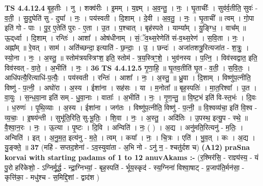 \documentclass[17pt]{extarticle}
\begin{document}
                  \newline
                                \textbf{ TS 4.4.12.4} \newline
                  बृ॒ह॒तीः । नु । शक्व॑रीः । इ॒मम् । य॒ज्ञ्म् । अ॒व॒न्तु॒ । नः॒ । घृ॒ताचीः᳚ । सुव॑र्व॒तीति॒ सुवः॑ - व॒ती॒ । सु॒दुघेति॑ सु - दुघा᳚ । नः॒ । पय॑स्वती । दि॒शाम् । दे॒वी । अ॒व॒तु॒ । नः॒ । घृ॒ताची᳚ ॥ त्वम् । गो॒पा इति॑ गो - पाः । पु॒र॒ ए॒तेति॑ पुरः - ए॒ता । उ॒त । प॒श्चात् । बृह॑स्पते । याम्या᳚म् । यु॒ङ्ग्धि॒ । वाच᳚म् ॥ ऊ॒द्‌र्ध्वा । दि॒शाम् । रन्तिः॑ । आशा᳚ । ओष॑धीनाम् । सं॒ॅव॒थ्स॒रेणेति॑ सं-व॒थ्स॒रेण॑ । स॒वि॒ता । नः॒ । अह्ना᳚म् ॥ रे॒वत् । साम॑ । अति॑॑च्छन्दा॒ इत्याति॑ - छ॒न्दाः॒ । उ॒ । छन्दः॑ । अजा॑तशत्रु॒रित्यजा॑त - श॒त्रुः॒ । स्यो॒ना । नः॒ । अ॒स्तु॒ ॥ स्तोम॑त्रयस्त्रिꣳश॒ इति॒ स्तोम॑ - त्र॒य॒स्त्रिꣳ॒॒शे॒ । भुव॑नस्य । प॒त्नि॒ । विव॑स्वद्वात॒ इति॒ विव॑स्वत् - वा॒ते॒ । अ॒भीति॑ । नः॒ । \textbf{  36} \newline
                  \newline
                                \textbf{ TS 4.4.12.5} \newline
                  गृ॒णा॒हि॒ ॥ घृ॒तव॒तीति॑ घृ॒त - व॒ती॒ । स॒वि॒तः॒ । आधि॑पत्यै॒रित्याधि॑-प॒त्यैः॒ । पय॑स्वती । रन्तिः॑ । आशा᳚ । नः॒ । अ॒स्तु॒ ॥ ध्रु॒वा । दि॒शाम् । विष्णु॑प॒त्नीति॒ विष्णु॑ - प॒त्नी॒ । अघो॑रा । अ॒स्य । ईशा॑ना । सह॑सः । या । म॒नोता᳚ ॥ बृह॒स्पतिः॑ । मा॒त॒रिश्वा᳚ । उ॒त । वा॒युः । स॒न्ध॒वा॒ना इति॑ सम् - धु॒वा॒नाः । वाताः᳚ । अ॒भीति॑ । नः॒ । गृ॒ण॒न्तु॒ ॥ वि॒ष्ट॒भं इति॑ वि-स्त॒भंः । दि॒वः । ध॒रुणः॑ । पृ॒थि॒व्याः । अ॒स्य । ईशा॑ना । जग॑तः । विष्णु॑प॒त्नीति॒ विष्णु॑ - प॒त्नी॒ ॥ वि॒श्वव्य॑चा॒ इति॑ वि॒श्व - व्य॒चाः॒ । इ॒षय॑न्ती । सुभू॑ति॒रिति॒ सु-भू॒तिः॒ । शि॒वा । नः॒ । अ॒स्तु॒ । अदि॑तिः । उ॒पस्थ॒ इत्यु॒प - स्थे॒ ॥ वै॒श्वा॒न॒रः । नः॒ । ऊ॒त्या । पृ॒ष्टः । दि॒वि । अन्विति॑ । नः॒ ( ) । अ॒द्य । अनु॑मति॒रित्यनु॑ - म॒तिः॒ । अन्विति॑ । इत् । अ॒नु॒म॒त॒ इत्य॑नु - म॒ते॒ । त्वम् । कया᳚ । नः॒ । चि॒त्रः । एति॑ । भु॒व॒त् । कः । अ॒द्य । यु॒ङ्क्ते॒ ॥ \textbf{  37} \newline
                  \newline
                      (महि॑ - सप्तद॒शेना॑ - ऽव॒स्युवा॑ता - अ॒भि नो - ऽनु॑ न॒ - श्चतु॑र्दश च)  \textbf{(A12)} \newline \newline
\textbf{praSna korvai with starting padams of 1 to 12 anuvAkams :-} \newline
(र॒श्मिर॑सि॒ - राज्ञ्य॑स्य॒ - यं पु॒रो हरि॑केशो॒ - ऽग्निर्मू॒र्द्ध - न्द्रा॒ग्निभ्यां॒ - बृह॒स्पति॑ - र्भूय॒स्कृद॑ - स्य॒ग्निना॑ विश्वा॒षाट् - प्र॒जाप॑ति॒र्मन॑सा॒ - कृत्ति॑का॒ - मधु॑श्च - स॒मिद्दि॒शां - द्वाद॑श ) \newline
\end{document}
